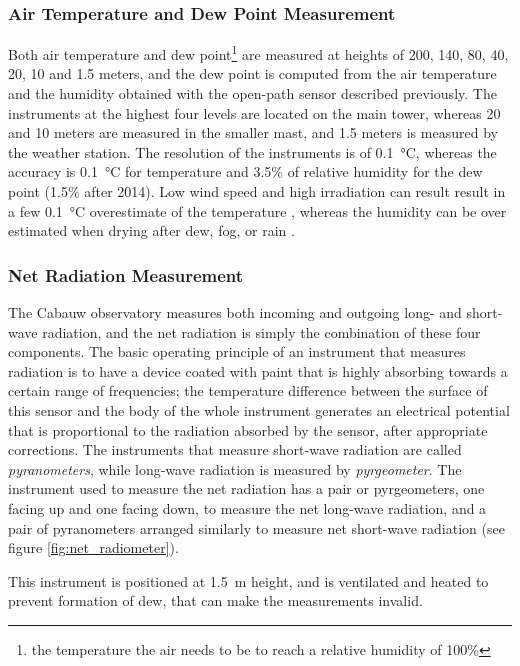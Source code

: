 \documentclass[a4paper,11pt]{kth-mag}
\begin{document}
\subsubsection{Air Temperature and Dew Point Measurement}
Both air temperature and dew point\footnote{the temperature the air needs to be to reach a relative humidity of 100\%} are measured at heights of 200, 140, 80, 40, 20, 10 and 1.5 meters, and the dew point is computed from the air temperature and the humidity obtained with the open-path sensor described previously. The instruments at the highest four levels are located on the main tower, whereas 20 and 10 meters are measured in the smaller mast, and 1.5 meters is measured by the weather station. The resolution of the instruments is of \SI{0.1}{\celsius}, whereas the accuracy is \SI{0.1}{\celsius} for temperature and 3.5\% of relative humidity for the dew point (1.5\% after 2014). Low wind speed and high irradiation can result result in a few \SI{0.1}{\celsius} overestimate of the temperature \citep{tempoverestimate}, whereas the humidity can be over estimated when drying after dew, fog, or rain \citep{cabauwinsitu}.



\subsubsection{Net Radiation Measurement}
The Cabauw observatory measures both incoming and outgoing long- and short-wave radiation, and the net radiation is simply the combination of these four components. The basic operating principle of an instrument that measures radiation is to have a device coated with paint that is highly absorbing towards a certain range of frequencies; the temperature difference between the surface of this sensor and the body of the whole instrument generates an electrical potential that is proportional to the radiation absorbed by the sensor, after appropriate corrections.  The instruments that measure short-wave radiation are called \emph{pyranometers}, while long-wave radiation is measured by \emph{pyrgeometer}.  The instrument used to measure the net radiation has a pair or pyrgeometers, one facing up and one facing down, to measure the net long-wave radiation, and a pair of pyranometers arranged similarly to measure net short-wave radiation (see figure \ref{fig:net_radiometer}).

This instrument is positioned at \SI{1.5}{\meter} height, and is ventilated and heated to prevent formation of dew, that can make the measurements invalid.
\end{document}

